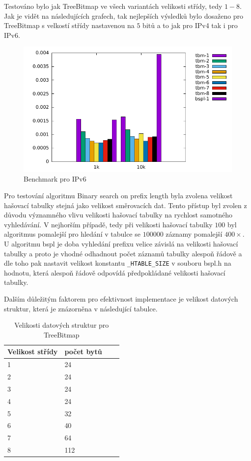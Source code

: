 Testováno bylo jak TreeBitmap ve všech variantách velikosti střídy, tedy $1-8$.
Jak je vidět na následujících grafech, tak nejlepších výsledků bylo dosaženo pro TreeBitmap s velkostí
střídy nastavenou na $5$ bitů a to jak pro IPv4 tak i pro IPv6.

\begin{figure}[!htbp]
	\centering
	\includegraphics[scale=1]{fig/lpm-ipv6.pdf}
	\caption{Benchmark pro IPv6}
\end{figure}\label{fig:lpm-ipv4}

Pro testování algoritmu Binary search on prefix length byla zvolena velikost hašovací tabulky
stejná jako velikost směrovacích dat. Tento přístup byl zvolen z důvodu významného vlivu
velikosti hašovací tabulky na rychlost samotného vyhledávání. V nejhorším případě, tedy při
velikosti hašovací tabulky $100$ byl algoritmus pomalejší pro hledání v tabulce se $100 000$ záznamy pomalejší
$400\times$.
U algoritmu bspl je doba vyhledání prefixu velice závislá na velikosti hašovací tabulky a proto je vhodné odhadnout počet záznamů tabulky alespoň řádově a dle toho pak nastavit velikost konstantu {\tt \_HTABLE\_SIZE} v souboru bspl.h na hodnotu, která alespoň řádově odpovídá předpokládané velikosti hašovací tabulky.

Dalším důležitým faktorem pro efektivnost implementace je velikost datových struktur, která je znázorněna v následující tabulce.

\begin{table}[!htbp]
	\center
	\label{tab:lpm-input}
    \begin{tabular}{|l|l|l|l|}
    \hline
    Velikost střídy & počet bytů \\ \hline
    1 & 24 \\ \hline
    2 & 24 \\ \hline
    3 & 24 \\ \hline
    4 & 24 \\ \hline
    5 & 32 \\ \hline
    6 & 40 \\ \hline
    7 & 64 \\ \hline
    8 & 112 \\ \hline
    \end{tabular}
	\caption{Velikosti datových struktur pro TreeBitmap}
\end{table}

